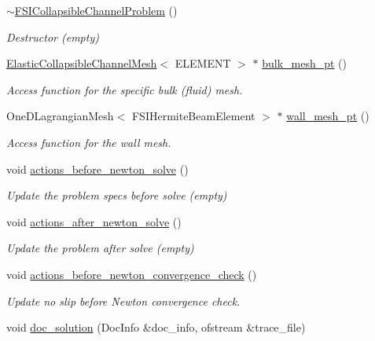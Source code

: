 \begin{DoxyCompactItemize}
\hyperlink{classFSICollapsibleChannelProblem_abe33aaaae15ea3eb10885527a1d1ad9a}{$\sim$\+F\+S\+I\+Collapsible\+Channel\+Problem} ()
\begin{DoxyCompactList}\small\item\em Destructor (empty) \end{DoxyCompactList}\item 
\hyperlink{classElasticCollapsibleChannelMesh}{Elastic\+Collapsible\+Channel\+Mesh}$<$ E\+L\+E\+M\+E\+NT $>$ $\ast$ \hyperlink{classFSICollapsibleChannelProblem_a90bfc02608e7fa6a69b14b6d5cfb939e}{bulk\+\_\+mesh\+\_\+pt} ()
\begin{DoxyCompactList}\small\item\em Access function for the specific bulk (fluid) mesh. \end{DoxyCompactList}\item 
One\+D\+Lagrangian\+Mesh$<$ F\+S\+I\+Hermite\+Beam\+Element $>$ $\ast$ \hyperlink{classFSICollapsibleChannelProblem_ae8b71da8da82f3c52387052ce400b930}{wall\+\_\+mesh\+\_\+pt} ()
\begin{DoxyCompactList}\small\item\em Access function for the wall mesh. \end{DoxyCompactList}\item 
void \hyperlink{classFSICollapsibleChannelProblem_ad10b2d12be052c6b1bc5005dc27cd229}{actions\+\_\+before\+\_\+newton\+\_\+solve} ()
\begin{DoxyCompactList}\small\item\em Update the problem specs before solve (empty) \end{DoxyCompactList}\item 
void \hyperlink{classFSICollapsibleChannelProblem_a49780267c05f4c6ecbed11bfc6b9956b}{actions\+\_\+after\+\_\+newton\+\_\+solve} ()
\begin{DoxyCompactList}\small\item\em Update the problem after solve (empty) \end{DoxyCompactList}\item 
void \hyperlink{classFSICollapsibleChannelProblem_ace5343d2e6e6e0480d077d4f17365288}{actions\+\_\+before\+\_\+newton\+\_\+convergence\+\_\+check} ()
\begin{DoxyCompactList}\small\item\em Update no slip before Newton convergence check. \end{DoxyCompactList}\item 
void \hyperlink{classFSICollapsibleChannelProblem_aff5cacbc8d81f6c1beda947085496462}{doc\+\_\+solution} (Doc\+Info \&doc\+\_\+info, ofstream \&trace\+\_\+file)

\end{DoxyCompactItemize}
